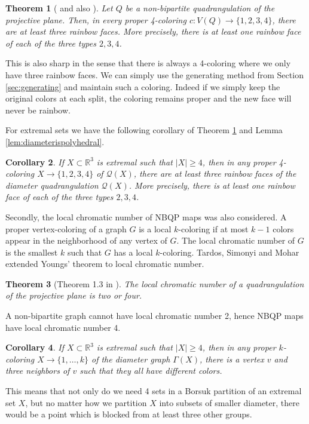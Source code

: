 \documentclass[10pt,a4paper]{article}
\newtheorem{theorem}{Theorem}[section]
\newtheorem{corollary}[theorem]{Corollary}
\newcommand{\R}[0]{\mathbb{R}}
\newcommand{\qt}{\mathcal{Q}}
\begin{document}
\begin{theorem}[\cite{mohar2006quadrangulations} and also \cite{KaiserLoNakamotoNozakiOzeki2025}]\label{thm:bettercol}
Let $Q$ be a non-bipartite quadrangulation of the projective plane. Then, in every proper 4-coloring $c:V(Q)\to\{1,2,3,4\}$, there are at least three rainbow faces. More precisely, there is at least one rainbow face of each of the three types $2,3,4$.
\end{theorem}

This is also sharp in the sense that there is always a 4-coloring where we only have three rainbow faces. We can simply use the generating method from Section \ref{sec:generating} and maintain such a coloring. Indeed if we simply keep the original colors at each split, the coloring remains proper and the new face will never be rainbow.  

For extremal sets we have the following corollary of Theorem \ref{thm:bettercol} and Lemma \ref{lem:diameterispolyhedral}. 

\begin{corollary}
    If $X\subset \R^3$ is extremal such that $|X|\ge 4$, then in any proper 4-coloring $X\to\{1,2,3,4\}$ of $\qt(X)$, there are at least three rainbow faces of the diameter quadrangulation $\qt(X)$. More precisely, there is at least one rainbow face of each of the three types $2,3,4$.
\end{corollary}

Secondly, the local chromatic number of NBQP maps was also considered. A proper vertex-coloring of a graph $G$ is a local $k$-coloring if at most $k-1$ colors appear in the neighborhood of any vertex of $G$. The local chromatic number of $G$ is the smallest $k$ such that $G$ has a local $k$-coloring. Tardos, Simonyi and Mohar extended Youngs' theorem to local chromatic number.


\begin{theorem}[Theorem 1.3 in \cite{mohar2013local}]
    The local chromatic number of a quadrangulation of the projective plane is two or four.
\end{theorem}

A non-bipartite graph cannot have local chromatic number 2, hence NBQP maps have local chromatic number 4. 

\begin{corollary}
     If $X\subset \R^3$ is extremal such that $|X|\ge 4$, then in any proper $k$-coloring $X\to\{1,\dots, k\}$ of the diameter graph $\Gamma(X)$, there is a vertex $v$ and three neighbors of $v$ such that they all have different colors. 
\end{corollary}
This means that not only do we need 4 sets in a Borsuk partition of an extremal set $X$, but no matter how we partition $X$ into subsets of smaller diameter, there would be a point which is blocked from at least three other groups. 
\end{document}
